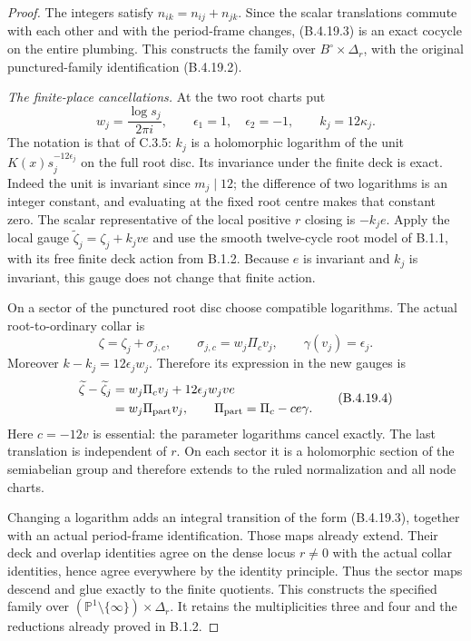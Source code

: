 \begin{proof}
The integers satisfy
$n_{ik}=n_{ij}+n_{jk}$. Since the scalar translations
commute with each other and with the period-frame
changes, (B.4.19.3) is an exact cocycle on the entire
plumbing. This constructs the family over
$B^\circ\times\Delta_r$, with the original
punctured-family identification (B.4.19.2).

\emph{The finite-place cancellations.}
At the two root charts put
\[
 w_j=\frac{\log s_j}{2\pi i},\qquad
 \epsilon_1=1,\quad\epsilon_2=-1,
 \qquad k_j=12\kappa_j.
\]
The notation is that of C.3.5: $k_j$ is a
holomorphic logarithm of the unit
$K(x)s_j^{-12\epsilon_j}$ on the full root disc.
Its invariance under the finite deck is exact.
Indeed the unit is invariant since $m_j\mid12$;
the difference of two logarithms is an integer
constant, and evaluating at the fixed root centre
makes that constant zero. The scalar representative
of the local positive $r$ closing is $-k_j e$.
Apply the local gauge
$\widetilde\zeta_j=\zeta_j+k_jve$ and use the
smooth twelve-cycle root model of B.1.1, with its
free finite deck action from B.1.2. Because $e$ is
invariant and $k_j$ is invariant, this gauge does
not change that finite action.

On a sector of the punctured root disc choose
compatible logarithms. The actual root-to-ordinary
collar is
\[
 \zeta=\zeta_j+\sigma_{j,c},\qquad
 \sigma_{j,c}=w_j\Pi_c v_j,
 \qquad \gamma(v_j)=\epsilon_j.
\]
Moreover $k-k_j=12\epsilon_jw_j$. Therefore its
expression in the new gauges is
\[
 \begin{aligned}
 \widetilde\zeta-\widetilde\zeta_j
 &=w_j\Pi_c v_j+12\epsilon_jw_jve\\
 &=w_j\Pi_{\rm part}v_j,
 \qquad \Pi_{\rm part}=\Pi_c-ce\gamma.
 \end{aligned}
 \tag{B.4.19.4}
\]
Here $c=-12v$ is essential: the parameter logarithms
cancel exactly. The last translation is independent
of $r$. On each sector it is a holomorphic section
of the semiabelian group and therefore extends to
the ruled normalization and all node charts.

Changing a logarithm adds an integral transition
of the form (B.4.19.3), together with an actual
period-frame identification. Those maps already
extend. Their deck and overlap identities agree
on the dense locus $r\ne0$ with the actual collar
identities, hence agree everywhere by the identity
principle. Thus the sector maps descend and glue
exactly to the finite quotients. This constructs
the specified family over
$(\mathbb P^1\setminus\{\infty\})\times\Delta_r$.
It retains the multiplicities three and four and
the reductions already proved in B.1.2.


\end{proof}
